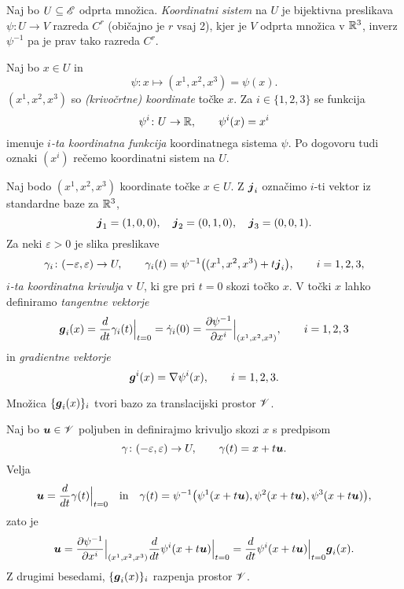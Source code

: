 \begin{definicija}
	Naj bo $U\subseteq\mathscr E$ odprta množica. \emph{Koordinatni sistem} na $U$ je bijektivna
	preslikava $\psi\colon U\to V$ razreda $C^r$ (običajno je $r$ vsaj 2), kjer je $V$ odprta
	množica v $\mathbb R^3$, inverz $\psi^{-1}$ pa je prav tako razreda $C^r$.
\end{definicija}

Naj bo $x\in U$ in
\[ \psi\colon x\mapsto (x^1,x^2,x^3)=\psi(x). \]
$(x^1,x^2,x^3)$ so \emph{(krivočrtne) koordinate} točke $x$.
Za $i\in\{1,2,3\}$ se funkcija
\[ \psi^i\colon U\to\mathbb R,\qquad \psi^i(x)=x^i \]
imenuje \emph{$i$-ta koordinatna funkcija} koordinatnega sistema $\psi$.
Po dogovoru tudi oznaki $(x^i)$ rečemo koordinatni sistem na $U$.

Naj bodo $(x^1,x^2,x^3)$ koordinate točke $x\in U$. Z $\boldsymbol j_i$ označimo
$i$-ti vektor iz standardne baze za $\mathbb R^3$,
\[ \boldsymbol j_1=(1,0,0),\quad\boldsymbol j_2=(0,1,0),\quad\boldsymbol j_3=(0,0,1). \]
Za neki $\varepsilon>0$ je slika preslikave
\begin{equation} \label{e:kokri}
	\gamma_i\colon(-\varepsilon,\varepsilon)\to U,\qquad
	\gamma_i(t)=\psi^{-1}\big((x^1,x^2,x^3)+t\boldsymbol j_i\big),\qquad i=1,2,3,
\end{equation}
\emph{$i$-ta koordinatna krivulja} v $U$, ki gre pri $t=0$ skozi točko $x$.
V točki $x$ lahko definiramo \emph{tangentne vektorje}
\begin{equation} \label{e:tanvek}
	\boldsymbol g_i(x)=\frac{d}{dt}\gamma_i(t)\Big|_{t=0}=\dot{\gamma}_i(0)
	=\frac{\partial\psi^{-1}}{\partial x^i}\Big|_{(x^1,x^2,x^3)}
	, \qquad i=1,2,3
\end{equation}
in \emph{gradientne vektorje}
\begin{equation} \label{e:gradvek}
	\boldsymbol g^i(x)=\nabla\psi^i(x),\qquad i=1,2,3.
\end{equation}

\begin{trditev}
	Množica $\{\boldsymbol g_i(x)\}_i$ tvori bazo za translacijski prostor $\mathscr V$.
\end{trditev}

\proof
	Naj bo $\boldsymbol u\in\mathscr V$ poljuben in definirajmo krivuljo skozi $x$ s predpisom
	\[ \gamma\colon(-\varepsilon,\varepsilon)\to U,\qquad \gamma(t)=x+t\boldsymbol u. \]
	Velja
	\[
		\boldsymbol u=\frac{d}{dt}\gamma(t)\Big|_{t=0}\quad\textrm{in}\quad
		\gamma(t)=\psi^{-1}\big(\psi^1(x+t\boldsymbol u),\psi^2(x+t\boldsymbol u),\psi^3(x+t\boldsymbol u)\big),
	\]
	zato je
	\[
		\boldsymbol u=
		\frac{\partial\psi^{-1}}{\partial x^i}\Big|_{(x^1,x^2,x^3)}
		\frac{d}{dt}\psi^i(x+t\boldsymbol u)\Big|_{t=0}=
		\frac{d}{dt}\psi^i(x+t\boldsymbol u)\Big|_{t=0}\boldsymbol g_i(x).
	\]
	Z drugimi besedami, $\{\boldsymbol g_i(x)\}_{i}$ razpenja prostor $\mathscr V$.
\endproof

